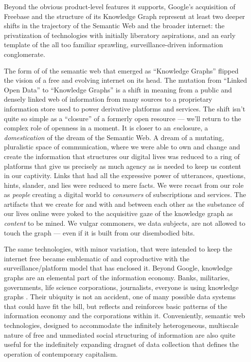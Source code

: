 Beyond the obvious product-level features it supports, Google's
acquisition of Freebase and the structure of its Knowledge Graph
represent at least two deeper shifts in the trajectory of the Semantic
Web and the broader internet: the privatization of technologies with
initially liberatory aspirations, and an early template of the all too
familiar sprawling, surveillance-driven information conglomerate.

The form of of the semantic web that emerged as ``Knowledge Graphs''
flipped the vision of a free and evolving internet on its head. The
mutation from ``Linked Open Data'' \cite{berners-leeLinkedData2006}  to ``Knowledge Graphs'' is a shift in meaning from a public and
densely linked web of information from many sources to a proprietary
information store used to power derivative platforms and services. The
shift isn't quite so simple as a ``closure'' of a formerly open resource
--- we'll return to the complex role of openness in a moment. It is
closer to an \emph{en}closure, a \emph{domestication} of the dream of
the Semantic Web. A dream of a mutating, pluralistic space of
communication, where we were able to own and change and create the
information that structures our digital lives was reduced to a ring of
platforms that give us precisely as much agency as is needed to keep us
content in our captivity. Links that had all the expressive power of
utterances, questions, hints, slander, and lies were reduced to mere
facts. We were recast from our role as \emph{people} creating a digital
world to \emph{consumers} of subscriptions and services. The artifacts
that we create for and with and between each other as the substance of
our lives online were yoked to the acquisitive gaze of the knowledge
graph as \emph{content} to be mined. We vulgar commoners, we data
subjects, are not allowed to touch the graph --- even if it is built
from our disembodied bits.

The same technologies, with minor variation, that were intended to keep
the internet free became emblematic of and coproductive with the
surveillance/platform model that has enclosed it. Beyond Google,
knowledge graphs are an elemental part of the information economy.
Banks, militaries, governments, life science corporations, journalists,
everyone is using knowledge graphs \cite{neo4jNeo4jCustomers, enterpriseknowledgegraphfoundationKnowledgeGraphIndustry2022} . Their
ubiquity is not an accident, one of many possible data systems that
could have fit the bill, but reflects and reinforces basic patterns of
the information economy and the corporations within it. Conveniently,
semantic web technologies, designed to accommodate the infinitely
heterogeneous, multiscale nature of free and unmediated social
structuring of information are also quite useful for the indefinitely
expanding dragnet of data collection that defines the operation of
contemporary capitalism.

